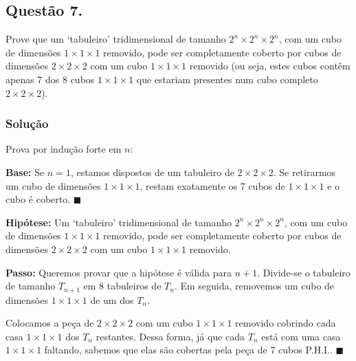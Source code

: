 \documentclass[12pt, letterpaper]{report}
\newcommand*{\CQD}{\hfill\ensuremath{\blacksquare}}%
\newcounter{ProblemNum}
\newcommand*{\anyproblem}[1]{\newpage\subsection*{#1}}
\newcommand*{\problem}[1]{\stepcounter{ProblemNum} %
   \anyproblem{Questão #1}}
\newcommand*{\soln}[1]{\subsubsection*{#1}}
\newcommand*{\solution}{\soln{Solução}}
\begin{document}
\problem{7.}
  Prove que um `tabuleiro' tridimensional de tamanho $ 2^n \times 2^n \times 2^n $, com um cubo de dimensões $ 1 \times 1 \times 1 $ removido, pode ser completamente coberto por cubos de dimensões $ 2 \times 2 \times 2 $ com um cubo $ 1 \times 1 \times 1 $ removido (ou seja, estes cubos contêm apenas 7 dos 8 cubos $ 1 \times 1 \times 1 $ que estariam presentes num cubo completo $ 2 \times 2 \times 2 $).
\solution
    Prova por indução forte em $n$:

    \textbf{Base:} Se $n = 1$, estamos dispostos de um tabuleiro de $ 2 \times 2 \times 2 $. Se retirarmos um cubo de dimensões $1 \times 1 \times 1$, restam exatamente os 7 cubos de $ 1 \times 1 \times 1 $ e o cubo é coberto.  \CQD

    \textbf{Hipótese:} Um `tabuleiro' tridimensional de tamanho $ 2^n \times 2^n \times 2^n $, com um cubo de dimensões $ 1 \times 1 \times 1 $ removido, pode ser completamente coberto por cubos de dimensões $ 2 \times 2 \times 2 $ com um cubo $ 1 \times 1 \times 1 $ removido.

    \textbf{Passo:} Queremos provar que a hipótese é válida para $n + 1$. Divide-se o tabuleiro de tamanho $T_{n + 1}$ em 8 tabuleiros de $T_n$. Em seguida, removemos um cubo de dimensões $ 1 \times 1 \times 1 $ de um dos $T_n$.

    Colocamos a peça de $ 2 \times 2 \times 2 $ com um cubo $ 1 \times 1 \times 1 $ removido cobrindo cada casa $ 1 \times 1 \times 1 $ dos $T_n$ restantes. Dessa forma, já que cada $T_n$ está com uma casa $1 \times 1 \times 1$ faltando, sabemos que
    elas são cobertas pela peça de 7 cubos P.H.I.. \CQD
\end{document}
